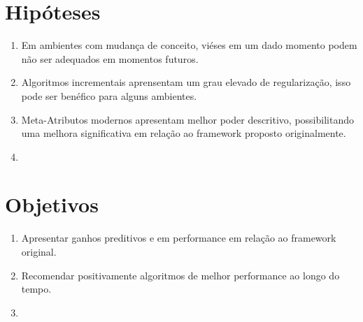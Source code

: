 \section{Hipóteses}

\begin{enumerate}
    \item Em ambientes com mudança de conceito, viéses em um dado momento
        podem não ser adequados em momentos futuros.
    \item Algoritmos incrementais aprensentam um grau elevado de regularização,
        isso pode ser benéfico para alguns ambientes.
    \item Meta-Atributos modernos apresentam melhor poder descritivo,
        possibilitando uma melhora significativa em relação ao framework
        proposto originalmente.
    \item 
\end{enumerate}

\section{Objetivos}

\begin{enumerate}
    \item Apresentar ganhos preditivos e em performance em relação ao framework
        original.
    \item Recomendar positivamente algoritmos de melhor performance ao longo do
        tempo.
    \item 
\end{enumerate}
